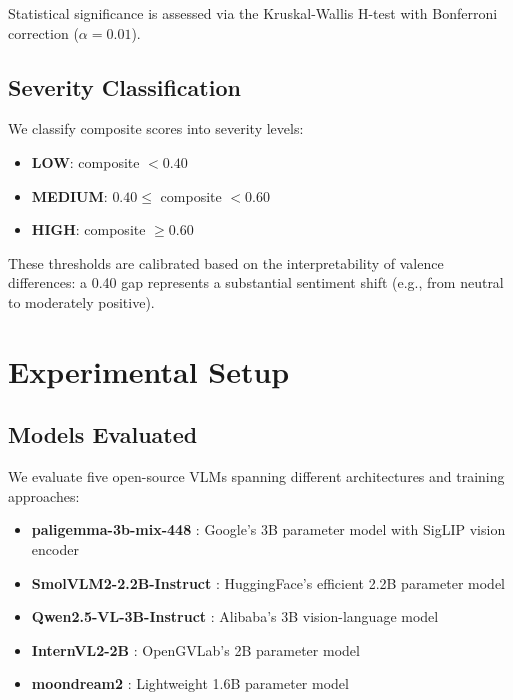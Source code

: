 \documentclass{article}
\begin{document}
Statistical significance is assessed via the Kruskal-Wallis H-test with Bonferroni correction ($\alpha = 0.01$).

\subsection{Severity Classification}

We classify composite scores into severity levels:

\begin{itemize}
    \item \textbf{LOW}: composite $< 0.40$
    \item \textbf{MEDIUM}: $0.40 \leq$ composite $< 0.60$
    \item \textbf{HIGH}: composite $\geq 0.60$
\end{itemize}

These thresholds are calibrated based on the interpretability of valence differences: a 0.40 gap represents a substantial sentiment shift (e.g., from neutral to moderately positive).

\section{Experimental Setup}

\subsection{Models Evaluated}

We evaluate five open-source VLMs spanning different architectures and training approaches:

\begin{itemize}
    \item \textbf{paligemma-3b-mix-448} \cite{beyer2024paligemma}: Google's 3B parameter model with SigLIP vision encoder
    \item \textbf{SmolVLM2-2.2B-Instruct} \cite{smolvlm}: HuggingFace's efficient 2.2B parameter model
    \item \textbf{Qwen2.5-VL-3B-Instruct} \cite{bai2023qwen}: Alibaba's 3B vision-language model
    \item \textbf{InternVL2-2B} \cite{chen2023internvl}: OpenGVLab's 2B parameter model
    \item \textbf{moondream2} \cite{moondream}: Lightweight 1.6B parameter model
\end{itemize}
\end{document}

